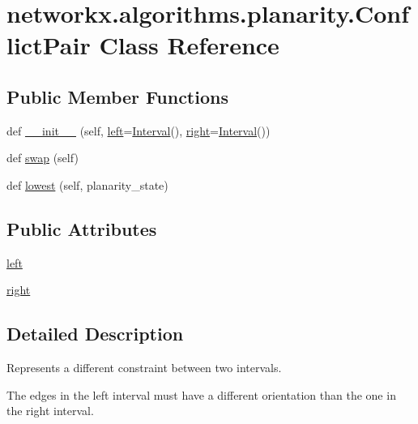 \hypertarget{classnetworkx_1_1algorithms_1_1planarity_1_1ConflictPair}{}\section{networkx.\+algorithms.\+planarity.\+Conflict\+Pair Class Reference}
\label{classnetworkx_1_1algorithms_1_1planarity_1_1ConflictPair}
\subsection*{Public Member Functions}
\begin{DoxyCompactItemize}
\item 
def \hyperlink{classnetworkx_1_1algorithms_1_1planarity_1_1ConflictPair_ae25e8628008ab0e5a7ea49b05dc9fc9e}{\+\_\+\+\_\+init\+\_\+\+\_\+} (self, \hyperlink{classnetworkx_1_1algorithms_1_1planarity_1_1ConflictPair_a3209d25850a4422d95b674d415dc6dd8}{left}=\hyperlink{classnetworkx_1_1algorithms_1_1planarity_1_1Interval}{Interval}(), \hyperlink{classnetworkx_1_1algorithms_1_1planarity_1_1ConflictPair_a31c5c7400b05c6e1a2d822d80ad5c301}{right}=\hyperlink{classnetworkx_1_1algorithms_1_1planarity_1_1Interval}{Interval}())
\item 
def \hyperlink{classnetworkx_1_1algorithms_1_1planarity_1_1ConflictPair_acce2f1103b0f66f0ed927dcf3eda36d3}{swap} (self)
\item 
def \hyperlink{classnetworkx_1_1algorithms_1_1planarity_1_1ConflictPair_a668f038a579843b764575ca962d070f3}{lowest} (self, planarity\+\_\+state)
\end{DoxyCompactItemize}
\subsection*{Public Attributes}
\begin{DoxyCompactItemize}
\item 
\hyperlink{classnetworkx_1_1algorithms_1_1planarity_1_1ConflictPair_a3209d25850a4422d95b674d415dc6dd8}{left}
\item 
\hyperlink{classnetworkx_1_1algorithms_1_1planarity_1_1ConflictPair_a31c5c7400b05c6e1a2d822d80ad5c301}{right}
\end{DoxyCompactItemize}


\subsection{Detailed Description}
\begin{DoxyVerb}Represents a different constraint between two intervals.

The edges in the left interval must have a different orientation than
the one in the right interval.
\end{DoxyVerb}
 

